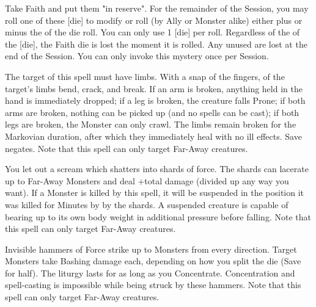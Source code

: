 \MYSTERY [
  Name = Kismet,
  Link = arcana-mystery-kismet,
  Paradigm = Entropy,
  Save = n/a,
  Duration = Session,
  Target = See Below
]

Take \DICE Faith and put them "in reserve".  For the remainder of the Session, you may roll one of these [die] to modify  \RO or \RB roll (by Ally or Monster alike) either plus or minus the \SUMDICE of the die roll.  You can only use 1 [die] per roll.  Regardless of the \SUMDICE of the [die], the Faith die is lost the moment it is rolled.  Any unused \DICE are lost at the end of the Session.  You can only invoke this mystery once per Session.

\MYSTERY [
  Name = Limbbreaker,
  Link = arcana-mystery-limbbreaker,
  Paradigm = Biomancy,
  Save = Y (neg.),
  Duration = Markovian,
  Target = Far-Away Target(s)
]

The target of this spell must have limbs.  With a snap of the fingers, \DICE of the target's limbs bend, crack, and break.  If an arm is broken, anything held in the hand is immediately dropped; if a leg is broken, the creature falls Prone; if both arms are broken, nothing can be picked up (and no spells can be cast); if both legs are broken, the Monster can only crawl.  The limbs remain broken for the Markovian duration, after which they immediately heal with no ill effects. Save negates.  Note that this spell can only target Far-Away creatures.

\MYSTERY [
  Name = Shrikeblast,
  Link = arcana-mystery-shrikeblast,
  Paradigm = Force,
  Save = Y (half),
  Duration = Instant,
  Target = Far-Away Target(s)
]

You let out a scream which shatters into shards of force.  The shards can lacerate up to \DICE  Far-Away Monsters and deal \SUMDICE+\DICE total damage (divided up any way you want).  If a Monster is killed by this spell, it will be suspended in the position it was killed for \SUMDICE Minutes by by the shards. A suspended creature is capable of bearing up to its own body weight in additional pressure before falling.  Note that this spell can only target Far-Away creatures.

\MYSTERY [
  Name = Storm of Hammers,
  Link = arcana-mystery-storm-of-hammers,
  Paradigm = Force,
  Save = Y (half),
  Duration = Concentration,
  Target = Far-Away Target(s)
]

Invisible hammers of Force strike up to \DICE Monsters from every direction.  Target Monsters take \DICE Bashing damage each, depending on how you split the die (Save for half).  The liturgy lasts for as long as you Concentrate.  Concentration and spell-casting is impossible while being struck by these hammers. Note that this spell can only target Far-Away creatures.

